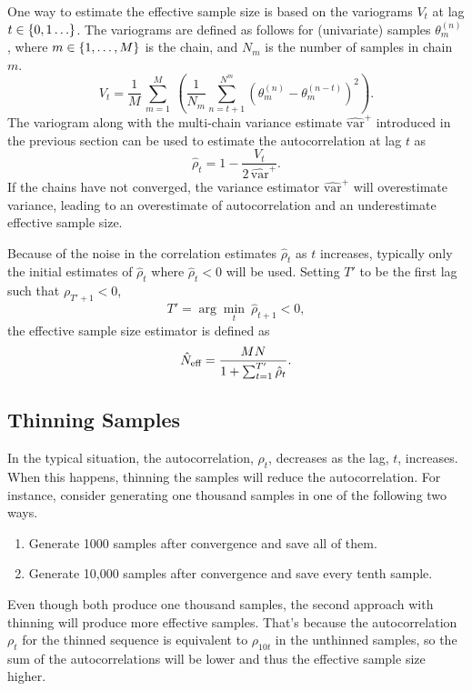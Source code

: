 One way to estimate the effective sample size is based on the
variograms $V_t$ at lag $t \in \setlist{0,1\ldots}$.  The variograms are
defined as follows for (univariate) samples $\theta_m^{(n)}$, where $m \in
\setlist{1,\ldots,M}$ is the chain, and $N_m$ is the number of samples
in chain $m$.
\[
V_t = 
\frac{1}{M}
\,
\sum_{m=1}^M 
\
\left(
\frac{1}{N_m}
\sum_{n=t+1}^{N^m}
\left(
\theta_m^{(n)} - \theta_m^{(n-t)}
\right)^2
\right).
\]
%
The variogram along with the multi-chain variance estimate
$\widehat{\mbox{var}}^{+}$ introduced in the previous section can be
used to estimate the autocorrelation at lag $t$ as
\[
\hat{\rho}_t
= 1 - \frac{\displaystyle V_t}{
            \displaystyle 2 \, \widehat{\mbox{var}}^{+}}.
\]
If the chains have not converged, the variance estimator
$\widehat{\mbox{var}}^{+}$ will overestimate variance, 
leading to an overestimate of autocorrelation and an underestimate
effective sample size.

Because of the noise in the correlation estimates $\hat{\rho}_t$ as $t$
increases, typically only the initial estimates of $\hat{\rho}_t$
where $\hat{\rho}_t < 0$ will be used.  Setting $T'$ to be the
first lag such that $\rho_{T' + 1} < 0$, 
\[
T' = \arg\min_t \ \hat{\rho}_{t+1} < 0,
\]
the effective sample size estimator is defined as
\[
\hat{N}_{\mbox{\scriptsize eff}}
= 
\frac{MN}
     {1 + \sum_{t=1}^{T'} \hat{\rho}_t}.
\]

\subsection{Thinning Samples}

In the typical situation, the autocorrelation, $\rho_t$, decreases as
the lag, $t$, increases.  When this happens, thinning the samples will
reduce the autocorrelation.  For instance, consider generating one
thousand samples in one of the following two ways.
%
\begin{enumerate}
\item Generate 1000 samples after convergence and save all of
  them.
\item Generate 10,000 samples after convergence and save every tenth
  sample.
\end{enumerate}
%
Even though both produce one thousand samples, the second approach
with thinning will produce more effective samples.  That's because the
autocorrelation $\rho_t$ for the thinned sequence is equivalent to
$\rho_{10t}$ in the unthinned samples, so the sum of the autocorrelations
will be lower and thus the effective sample size higher.  

